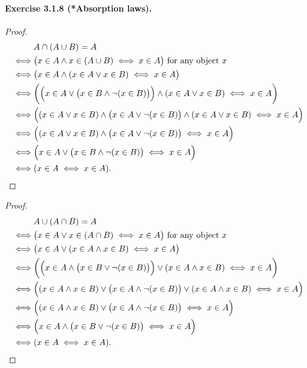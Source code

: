 \paragraph{Exercise 3.1.8 (*Absorption laws).}
\begin{proof}
    \begin{align*}
        & A \cap (A \cup B) = A
        \\\iff& \big( x \in A \land x \in (A \cup B) \iff x \in A \big) \text{ for any object $x$}
        \\\iff& \big( x \in A \land (x \in A \lor x \in B) \iff x \in A \big)
        \\\iff& \bigg( \Big(x \in A \lor \big(x\in B \land \lnot (x \in B) \big) \Big) \land (x \in A \lor x \in B) \iff x \in A \bigg)
        \\\iff& \Big( (x\in A \lor x \in B) \land \big( x\in A \lor \lnot(x \in B) \big) \land (x\in A \lor x \in B) \iff x \in A \Big)
        \\\iff& \Big( (x\in A \lor x \in B) \land \big( x\in A \lor \lnot(x \in B) \big) \iff x \in A \Big)
        \\\iff& \Big( x\in A \lor \big(x\in B \land \lnot(x\in B) \big) \iff x \in A \Big)
        \\\iff& ( x\in A \iff x \in A ). \qedhere
    \end{align*}
\end{proof}
\begin{proof}
    \begin{align*}
        & A \cup (A \cap B) = A
        \\\iff& \big( x \in A \lor x \in (A \cap B) \iff x \in A \big) \text{ for any object $x$}
        \\\iff& \big( x \in A \lor (x \in A \land x \in B) \iff x \in A \big)
        \\\iff& \bigg( \Big(x \in A \land \big(x\in B \lor \lnot (x \in B) \big) \Big) \lor (x \in A \land x \in B) \iff x \in A \bigg)
        \\\iff& \Big( (x\in A \land x \in B) \lor \big( x\in A \land \lnot(x \in B) \big) \lor (x\in A \land x \in B) \iff x \in A \Big)
        \\\iff& \Big( (x\in A \land x \in B) \lor \big( x\in A \land \lnot(x \in B) \big) \iff x \in A \Big)
        \\\iff& \Big( x\in A \land \big(x\in B \lor \lnot(x\in B) \big) \iff x \in A \Big)
        \\\iff& ( x\in A \iff x \in A ). \qedhere
    \end{align*}
\end{proof}

